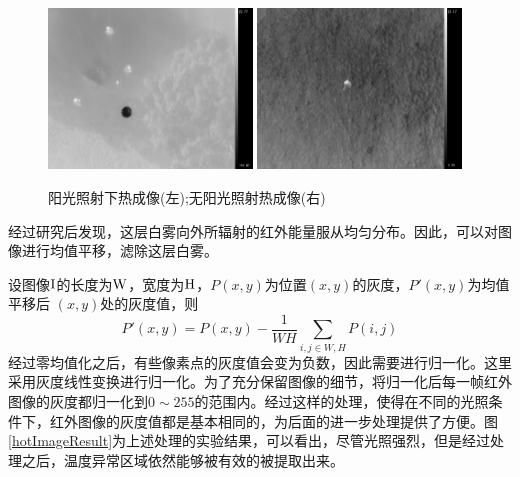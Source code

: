 \begin{figure}[h]
    \centering
    \includegraphics[height=4.27cm]{figures/4-1-红外图像左.jpg}
    \quad
    \includegraphics[height=4.27cm]{figures/4-1-红外图像右.jpg}
    \caption{阳光照射下热成像(左);无阳光照射热成像(右)}\label{hotImage}
\end{figure}

经过研究后发现，这层白雾向外所辐射的红外能量服从均匀分布。因此，可以对图像进行均值平移，滤除这层白雾。

设图像$\rm I$的长度为$\rm W$，宽度为$\rm H$，$P(x,y)$为位置$(x,y)$的灰度，$P'(x,y)$为均值平移后 $(x,y)$处的灰度值，则
\begin{equation}\label{平移}
P'(x,y)=P(x,y)-\frac{1}{WH}\sum_{i,j\in{W,H}} P(i,j)
\end{equation}
经过零均值化之后，有些像素点的灰度值会变为负数，因此需要进行归一化。这里采用灰度线性变换进行归一化。为了充分保留图像的细节，将归一化后每一帧红外图像的灰度都归一化到$0\sim255$的范围内。经过这样的处理，使得在不同的光照条件下，红外图像的灰度值都是基本相同的，为后面的进一步处理提供了方便。图\ref{hotImageResult}为上述处理的实验结果，可以看出，尽管光照强烈，但是经过处理之后，温度异常区域依然能够被有效的被提取出来。


